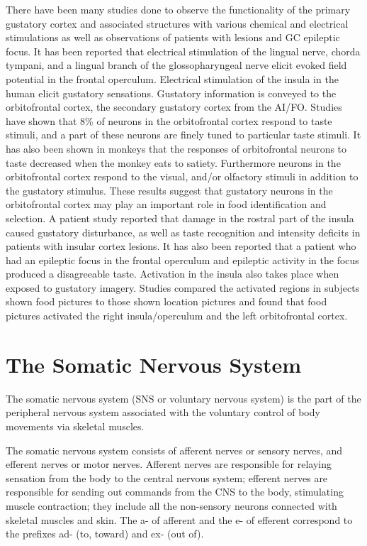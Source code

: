 \documentclass[]{book}
\begin{document}
There have been many studies done to observe the functionality of the primary gustatory cortex and associated structures with various chemical and electrical stimulations as well as observations of patients with lesions and GC epileptic focus. It has been reported that electrical stimulation of the lingual nerve, chorda tympani, and a lingual branch of the glossopharyngeal nerve elicit evoked field potential in the frontal operculum. Electrical stimulation of the insula in the human elicit gustatory sensations. Gustatory information is conveyed to the orbitofrontal cortex, the secondary gustatory cortex from the AI/FO. Studies have shown that 8\% of neurons in the orbitofrontal cortex respond to taste stimuli, and a part of these neurons are finely tuned to particular taste stimuli. It has also been shown in monkeys that the responses of orbitofrontal neurons to taste decreased when the monkey eats to satiety. Furthermore neurons in the orbitofrontal cortex respond to the visual, and/or olfactory stimuli in addition to the gustatory stimulus. These results suggest that gustatory neurons in the orbitofrontal cortex may play an important role in food identification and selection. A patient study reported that damage in the rostral part of the insula caused gustatory disturbance, as well as taste recognition and intensity deficits in patients with insular cortex lesions. It has also been reported that a patient who had an epileptic focus in the frontal operculum and epileptic activity in the focus produced a disagreeable taste. Activation in the insula also takes place when exposed to gustatory imagery. Studies compared the activated regions in subjects shown food pictures to those shown location pictures and found that food pictures activated the right insula/operculum and the left orbitofrontal cortex.

\hypertarget{the-somatic-nervous-system}{%
\chapter{The Somatic Nervous System}\label{the-somatic-nervous-system}}

The somatic nervous system (SNS or voluntary nervous system) is the part of the peripheral nervous system associated with the voluntary control of body movements via skeletal muscles.

The somatic nervous system consists of afferent nerves or sensory nerves, and efferent nerves or motor nerves. Afferent nerves are responsible for relaying sensation from the body to the central nervous system; efferent nerves are responsible for sending out commands from the CNS to the body, stimulating muscle contraction; they include all the non-sensory neurons connected with skeletal muscles and skin. The a- of afferent and the e- of efferent correspond to the prefixes ad- (to, toward) and ex- (out of).
\end{document}
